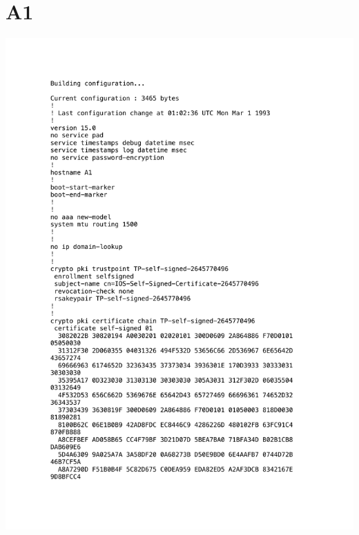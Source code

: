 \documentclass[11pt,a4paper]{scrreprt}
\begin{document}
\section{A1}
\vspace{-1cm}
\includegraphics[height=\dimexpr\textheight-4\baselineskip\relax,page=1]{../config_files/A1.pdf}

\end{document}
